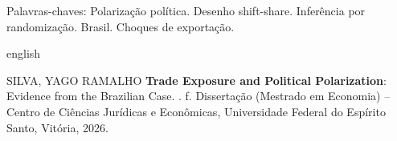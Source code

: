 \documentclass[
	11pt,				%
	oneside,			%
	a4paper,			%
	english,			%
	english				%
	]{abntex2ppgsi}
\theoremstyle{plain}
\theoremstyle{remark}
\theoremstyle{plain}%
\theoremstyle{remark}%
\begin{document}
\begin{resumo}
Palavras-chaves: Polarização política. Desenho shift-share. Inferência por randomização. Brasil. Choques de exportação.
\end{resumo}

%
%
\begin{resumo}[Abstract]
\begin{otherlanguage*}{english}

%
%
%
%


\begin{flushleft}
SILVA, YAGO RAMALHO \textbf{Trade Exposure and Political Polarization}: Evidence from the Brazilian Case. \imprimirdata. \pageref{LastPage} f. Dissertação (Mestrado em Economia) – Centro de Ciências Jurídicas e Econômicas, Universidade Federal do Espírito Santo, Vitória, 2026.
\end{flushleft}



\end{otherlanguage*}
\end{resumo}
\end{document}
